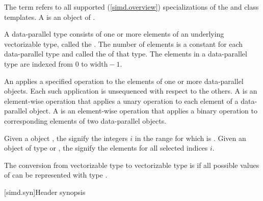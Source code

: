 \pnum
The term  refers to all supported (\ref{simd.overview}) specializations of the  and  class templates. A  is an object of .

\pnum
A data-parallel type consists of one or more elements of an underlying vectorizable type,
called the .
The number of elements is a constant for each data-parallel type and called the
 of that type.
The elements in a data-parallel type are indexed from 0 to $\textrm{width} - 1$.

\pnum
An  applies a specified operation to the elements of one or more data-parallel objects. Each such application is unsequenced with respect to the others. A  is an element-wise operation that applies a unary operation to each element of a data-parallel object. A  is an element-wise operation that applies a binary operation to corresponding elements of two data-parallel objects.

\pnum\label{wording.selected.indices}%
Given a  object , the
 signify the integers $i$ in the range \tcode{[0,
mask.size())} for which  is .
Given an object  of type  or ,
the  signify the elements  for all selected indices $i$.

\pnum
The conversion from vectorizable type  to vectorizable type  is  if
all possible values of  can be represented with type .

[simd.syn]{Header \texorpdfstring{}{<simd>} synopsis}

